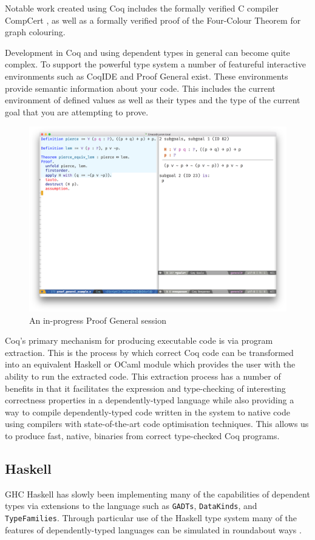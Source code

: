 \documentclass[a4paper, notitlepage]{report}
\begin{document}
Notable work created using Coq includes the formally verified C compiler
CompCert \cite{leroy_compiler_2009}, as well as a formally verified proof of the
Four-Colour Theorem \cite{gonthier_formal_2008} for graph colouring.

Development in Coq and using dependent types in general can become quite
complex. To support the powerful type system a number of featureful interactive
environments such as CoqIDE and Proof General \cite{proof_general} exist. These
environments provide semantic information about your code. This includes the
current environment of defined values as well as their types and the type of the
current goal that you are attempting to prove.

\begin{figure}[H]
\centering
\includegraphics[width=0.85\linewidth]{./fig/proof_general.png}
\caption{An in-progress Proof General session}
\end{figure}

Coq's primary mechanism for producing executable code is via program extraction.
This is the process by which correct Coq code can be transformed into an
equivalent Haskell or OCaml module which provides the user with the ability to
run the extracted code. This extraction process has a number of benefits in that
it facilitates the expression and type-checking of interesting correctness
properties in a dependently-typed language while also providing a way to compile
dependently-typed code written in the system to native code using compilers with
state-of-the-art code optimisation techniques. This allows us to produce fast,
native, binaries from correct type-checked Coq programs.

\subsection{Haskell}
\label{sec:org09bf660}
GHC Haskell has slowly been implementing many of the capabilities of dependent
types via extensions to the language such as \texttt{GADTs}, \texttt{DataKinds}, and
\texttt{TypeFamilies}. Through particular use of the Haskell type system many of the
features of dependently-typed languages can be simulated in roundabout ways
\cite{mcbride_faking_2002,lindley_hasochism_2013}.
\end{document}
